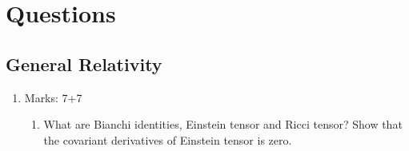 \documentclass[../main-sheet.tex]{subfiles}
\begin{document}
\chapter{Questions}
\section{General Relativity}
\begin{enumerate}
    \item Marks: 7+7
    \begin{enumerate}
        \item What are Bianchi identities, Einstein tensor and Ricci tensor? Show that the covariant derivatives of Einstein tensor is zero.
            
            
            


\end{enumerate}
\end{enumerate}
\end{document}
